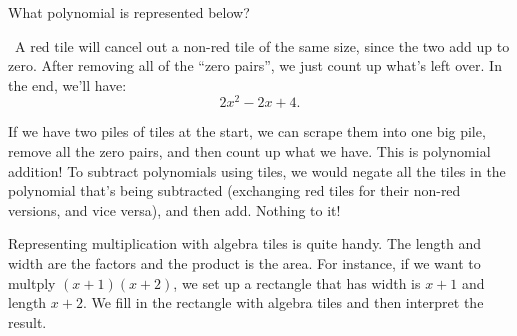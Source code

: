 \begin{boxex}
What polynomial is represented below?

\begin{center}
\end{center}

\exsoln\ A red tile will cancel out a non-red tile of the same size, since the two add up to zero. After removing all of the ``zero pairs'', we just count up what's left over. In the end, we'll have:
\[2x^2 - 2x + 4.\]
\end{boxex}

If we have two piles of tiles at the start, we can scrape them into one big pile, remove all the zero pairs, and then count up what we have. This is polynomial addition! To subtract polynomials using tiles, we would negate all the tiles in the polynomial that's being subtracted (exchanging red tiles for their non-red versions, and vice versa), and then add. Nothing to it!

Representing multiplication with algebra tiles is quite handy. The length and width are the factors and the product is the area. For instance, if we want to multply $(x+1)(x+2)$, we set up a rectangle that has width is $x+1$ and length $x+2$. We fill in the rectangle with algebra tiles and then interpret the result.


